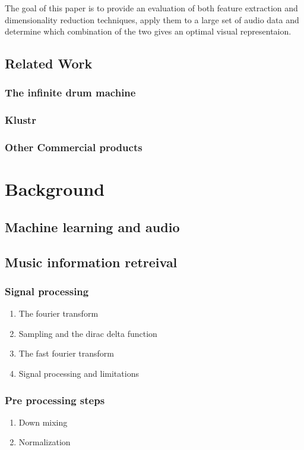 \documentclass[11pt]{article}
\begin{document}
The goal of this paper is to provide an evaluation of both feature extraction and dimensionality reduction techniques, apply them to a large set of audio data and determine which combination of the two gives an optimal visual representaion.

\subsection{Related Work}
\label{sec:org42eee01}
\subsubsection{The infinite drum machine}
\label{sec:org4401227}
\subsubsection{Klustr}
\label{sec:org02aa748}
\subsubsection{Other Commercial products}
\label{sec:orgc78ac43}
\section{Background}
\label{sec:org4d1b31d}
\subsection{Machine learning and audio}
\label{sec:orgafd5aa0}
\subsection{Music information retreival}
\label{sec:orge32af72}
\subsubsection{Signal processing}
\label{sec:org19fe369}
\begin{enumerate}
\item The fourier transform
\label{sec:org8e1fd90}
\item Sampling and the dirac delta function
\label{sec:orgd9ae2f1}
\item The fast fourier transform
\label{sec:org49e433d}
\item Signal processing and limitations
\label{sec:orgcde52dd}
\end{enumerate}
\subsubsection{Pre processing steps}
\label{sec:orgdd5f8ff}
\begin{enumerate}
\item Down mixing
\label{sec:org38fd0e8}
\item Normalization
\label{sec:orgda013eb}
\end{enumerate}
\end{document}
